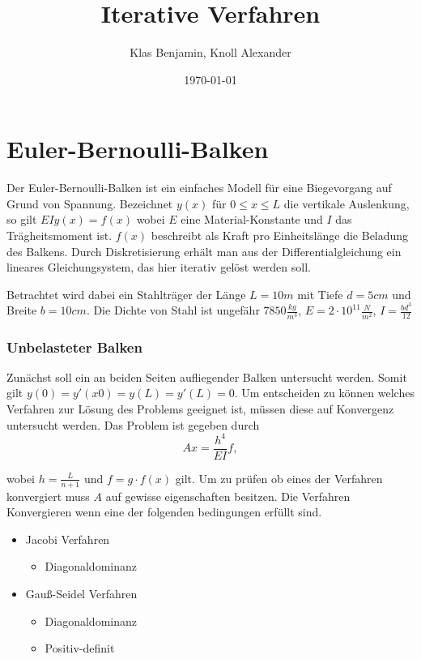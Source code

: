 \documentclass[12pt,titlepage]{article}
\author{Klas Benjamin, Knoll Alexander }
\title{Iterative Verfahren}
\date{\today}
\begin{document}
\maketitle

\part*{Euler-Bernoulli-Balken}

	Der Euler-Bernoulli-Balken ist ein einfaches Modell für eine Biegevorgang auf Grund von
	Spannung. Bezeichnet $y(x)$ für $0 ≤ x ≤ L$ die vertikale Auslenkung, so gilt
	$EIy (x) = f (x)$ wobei $E$ eine Material-Konstante und $I$ das Trägheitsmoment ist. 
	$f(x)$ beschreibt als Kraft pro Einheitslänge die Beladung des Balkens. Durch Diskretisierung erhält man aus der Differentialgleichung ein lineares Gleichungsystem, das hier iterativ gelöst werden soll.
	
	Betrachtet wird dabei ein Stahlträger der Länge $L = 10m$ mit Tiefe $d = 5cm$ und Breite $b = 10cm$. Die Dichte von Stahl ist ungefähr $7850 \frac{kg}{m^3}$, 
	$E = 2 \cdot 10^11 \frac{N}{m^2}$, $I = \frac{bd^3}{12}$

\section{Unbelasteter Balken}

	Zunächst soll ein an beiden Seiten aufliegender Balken untersucht werden.
	Somit gilt $y(0) = y'(x0) = y(L) = y'(L) = 0 $.\newline
	Um entscheiden zu können welches Verfahren zur Lösung des Problems geeignet ist, müssen diese auf Konvergenz untersucht werden. Das Problem ist gegeben durch
	\begin{equation}
		Ax = \frac{h^4}{EI}f,
	\end{equation}
	
	wobei $h = \frac{L}{n+1}$ und $f = g \cdot f(x)$ gilt. Um zu prüfen ob eines der Verfahren konvergiert muss $A$ auf gewisse eigenschaften besitzen. Die Verfahren Konvergieren wenn eine der folgenden bedingungen erfüllt sind.
	
	\begin{itemize}
		\centering
		\item Jacobi Verfahren
		\begin{itemize}
			\centering	
			\item Diagonaldominanz
		\end{itemize}
		\item Gauß-Seidel Verfahren
		\begin{itemize}
			\centering
			\item Diagonaldominanz
			\item Positiv-definit
		\end{itemize}
	\end{itemize}
	
\end{document}
